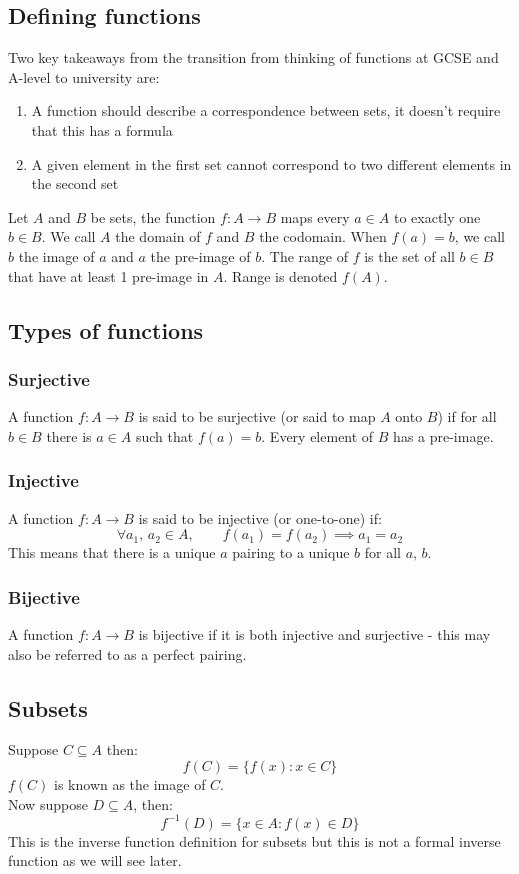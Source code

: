 \documentclass[12pt]{article}
\begin{document}
\subsection*{Defining functions}
Two key takeaways from the transition from thinking of functions at GCSE and A-level to university are:
\begin{enumerate}
    \item A function should describe a correspondence between sets, it doesn't require that this has a formula
    \item A given element in the first set cannot correspond to two different elements in the second set
\end{enumerate}
Let \(A\) and \(B\) be sets, the function \(f:A \to B\) maps every \(a\in A\) to exactly one \(b \in B\). We call \(A\) the domain of \(f\) and \(B\) the codomain. When \(f(a) = b\), we call \(b\) the image of \(a\) and \(a\) the pre-image of \(b\). The range of \(f\) is the set of all \(b\in B\) that have at least 1 pre-image in \(A\). Range is denoted \(f(A)\).
\subsection*{Types of functions}
\subsubsection*{Surjective}
A function \(f : A \to B\) is said to be surjective (or said to map \(A\) onto \(B\)) if for all \(b\in B\) there is \(a\in A\) such that \(f (a) = b\). Every element of \(B\) has a pre-image.
\subsubsection*{Injective}
A function \(f : A \to B\) is said to be injective (or one-to-one) if:
\[\forall a_1,\,a_2\in A,\qquad f(a_1) = f(a_2) \implies a_1=a_2\]
This means that there is a unique \(a\) pairing to a unique \(b\) for all \(a,\,b\).
\subsubsection*{Bijective}
A function \(f : A \to B\) is bijective if it is both injective and surjective - this may also be referred to as a perfect pairing.
\subsection*{Subsets}
Suppose \(C\subseteq A\) then:
\[f(C)=\{f(x):x\in C\}\]
\(f(C)\) is known as the image of \(C\).
\\
Now suppose \(D\subseteq A\), then:
\[f^{-1}(D)=\{x\in A:f(x)\in D\}\]
This is the inverse function definition for subsets but this is not a formal inverse function as we will see later.
\end{document}
